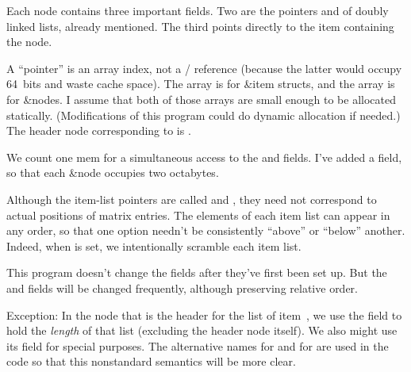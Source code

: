 Each node contains three important fields. Two are the pointers 
and  of doubly linked lists, already mentioned.
The third points directly to the item containing the node.

A ``pointer'' is an array index, not a \CEE/ reference (because the latter
would occupy 64~bits and waste cache space). The  array is for
\&{item} structs, and the  array is for \&{node}s. I assume that
both of
those arrays are small enough to be allocated statically. (Modifications
of this program could do dynamic allocation if needed.)
The header node corresponding to  is .

We count one mem for a simultaneous access to the  and 
fields.
I've added a  field, so that each \&{node} occupies two
octabytes.

Although the item-list pointers are called  and , they
need not
correspond to actual positions of matrix entries. The elements of
each item list can appear in any order, so that one option
needn't be consistently ``above'' or ``below'' another. Indeed, when
 is set, we intentionally scramble each item list.

This program doesn't change the  fields after they've first been
set up.
But the  and  fields will be changed frequently,
although preserving
relative order.

Exception: In the node  that is the header for the list of
item~, we use the  field to hold the {\it length\/} of that
list (excluding the header node itself).
We also might use its  field for special purposes.
The alternative names  for  and  for 
are used in the code so that this nonstandard semantics will be more clear.

